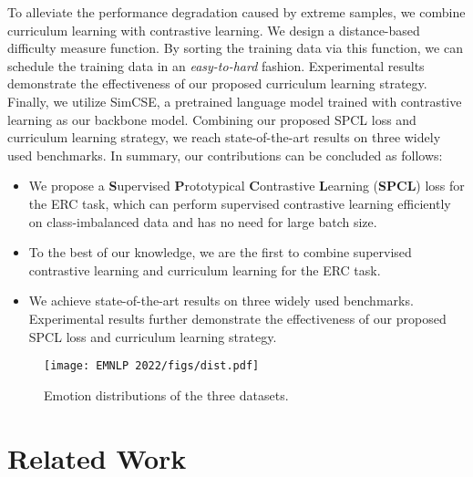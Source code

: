 \documentclass[11pt]{article}
\begin{document}
To alleviate the performance degradation caused by extreme samples, we combine curriculum learning\cite{bengio2009curriculum} with contrastive learning. We design a distance-based difficulty measure function. By sorting the training data via this function, we can schedule the training data in an \textit{easy-to-hard} fashion. Experimental results demonstrate the effectiveness of our proposed curriculum learning strategy. Finally, we utilize SimCSE\cite{gao2021simcse}, a pretrained language model trained with contrastive learning as our backbone model. Combining our proposed SPCL loss and curriculum learning strategy, we reach state-of-the-art results on three widely used benchmarks. In summary, our contributions can be concluded as follows:
\begin{itemize}
    \item We propose a \textbf{S}upervised \textbf{P}rototypical \textbf{C}ontrastive \textbf{L}earning (\textbf{SPCL}) loss for the ERC task, which can perform supervised contrastive learning efficiently on class-imbalanced data and has no need for large batch size.
    \item To the best of our knowledge, we are the first to combine supervised contrastive learning and curriculum learning for the ERC task.
    \item We achieve state-of-the-art results on three widely used benchmarks. Experimental results further demonstrate the effectiveness of our proposed SPCL loss and curriculum learning strategy.
\end{itemize}

\begin{figure}[h]
    \centering
    \texttt{[image: EMNLP 2022/figs/dist.pdf]}
    \caption{Emotion distributions of the three datasets.}
    \label{fig:my_label}
\end{figure}


\section{Related Work}
\end{document}
